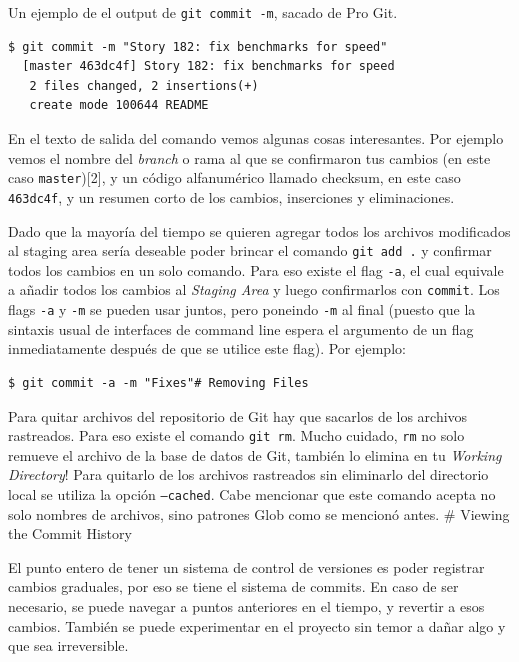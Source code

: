 \documentclass[spanish, 12pt, a4paper]{article}
\begin{document}
Un ejemplo de el output de \passthrough{\lstinline!git commit -m!},
sacado de Pro Git.

\begin{lstlisting}
$ git commit -m "Story 182: fix benchmarks for speed"
  [master 463dc4f] Story 182: fix benchmarks for speed
   2 files changed, 2 insertions(+)
   create mode 100644 README
\end{lstlisting}

En el texto de salida del comando vemos algunas cosas interesantes. Por
ejemplo vemos el nombre del \emph{branch} o rama al que se confirmaron
tus cambios (en este caso \passthrough{\lstinline!master!}){[}2{]}, y un
código alfanumérico llamado checksum, en este caso
\passthrough{\lstinline!463dc4f!}, y un resumen corto de los cambios,
inserciones y eliminaciones.

Dado que la mayoría del tiempo se quieren agregar todos los archivos
modificados al staging area sería deseable poder brincar el comando
\passthrough{\lstinline!git add .!} y confirmar todos los cambios en un
solo comando. Para eso existe el flag \passthrough{\lstinline!-a!}, el
cual equivale a añadir todos los cambios al \emph{Staging Area} y luego
confirmarlos con \passthrough{\lstinline!commit!}. Los flags
\passthrough{\lstinline!-a!} y \passthrough{\lstinline!-m!} se pueden
usar juntos, pero poneindo \passthrough{\lstinline!-m!} al final (puesto
que la sintaxis usual de interfaces de command line espera el argumento
de un flag inmediatamente después de que se utilice este flag). Por
ejemplo:

\begin{lstlisting}
$ git commit -a -m "Fixes"# Removing Files
\end{lstlisting}

Para quitar archivos del repositorio de Git hay que sacarlos de los
archivos rastreados. Para eso existe el comando
\passthrough{\lstinline!git rm!}. Mucho cuidado,
\passthrough{\lstinline!rm!} no solo remueve el archivo de la base de
datos de Git, también lo elimina en tu \emph{Working Directory}! Para
quitarlo de los archivos rastreados sin eliminarlo del directorio local
se utiliza la opción \passthrough{\lstinline!–cached!}. Cabe mencionar
que este comando acepta no solo nombres de archivos, sino patrones Glob
como se mencionó antes. \# Viewing the Commit History

El punto entero de tener un sistema de control de versiones es poder
registrar cambios graduales, por eso se tiene el sistema de commits. En
caso de ser necesario, se puede navegar a puntos anteriores en el
tiempo, y revertir a esos cambios. También se puede experimentar en el
proyecto sin temor a dañar algo y que sea irreversible.
\end{document}

